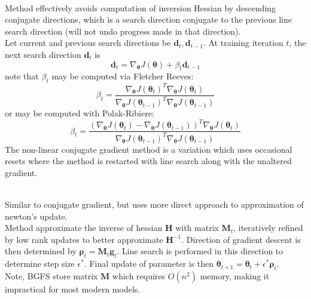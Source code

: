 \begin{remark} \\
Method effectively avoids computation of inversion Hessian by descending conjugate directions, which is a search direction conjugate to the previous line search direction (will not undo progress made in that direction).\\
Let current and previous search directions be $\bm{d}_{t}, \bm{d}_{t-1}$. At training iteration $t$, the next search direction $\bm{d}_t$ is
\begin{equation}
\bm{d}_t = \nabla_{\bm{\theta}} J(\bm{\theta}) + \beta_t \bm{d}_{t-1} \nonumber
\end{equation}
note that $\beta_t$ may be computed via Fletcher Reeves:
\begin{equation}
\beta_t = \frac{\nabla_{\bm{\theta}} J(\bm{\theta}_t)^T \nabla_{\bm{\theta}} J(\bm{\theta}_t)}{\nabla_{\bm{\theta}} J(\bm{\theta}_{t-1})^T \nabla_{\bm{\theta}} J(\bm{\theta}_{t-1})} \nonumber
\end{equation}
or may be computed with Polak-Ribiere:
\begin{equation}
\beta_t = \frac{(\nabla_{\bm{\theta}} J(\bm{\theta}_t) - \nabla_{\bm{\theta}} J(\bm{\theta}_{t-1}))^T \nabla_{\bm{\theta}} J(\bm{\theta}_t)}{\nabla_{\bm{\theta}} J(\bm{\theta}_{t-1})^T \nabla_{\bm{\theta}} J(\bm{\theta}_{t-1})} \nonumber
\end{equation}
The non-linear conjugate gradient method is a variation which uses occasional resets where the method is restarted with line search along with the unaltered gradient.
\end{remark}

\begin{remark} \\
Similar to conjugate gradient, but uses more direct approach to approximation of newton's update.\\
Method approximate the inverse of hessian $\bm{H}$ with matrix $\bm{M}_t$, iteratively refined by low rank updates to better approximate $\bm{H}^{-1}$. Direction of gradient descent is then determined by $\bm{\rho}_t = \bm{M}_t \bm{g}_t$. Line search is performed in this direction to determine step size $\epsilon^{*}$. Final update of parameter is then $\bm{\theta}_{t+1} = \bm{\theta}_t + \epsilon^{*} \bm{\rho}_{t}$.\\
Note, BGFS store matrix $\bm{M}$ which requires $O(n^2)$ memory, making it impractical for most modern models.
\end{remark}

